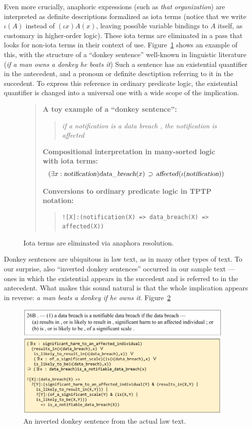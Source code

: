 \documentclass{IOS-Book-Article}
\newcommand{\eop}[1]{\mbox{\textsl{#1}}}
\newcommand{\bequ}{\begin{quote}}
\newcommand{\enqu}{\end{quote}}
\begin{document}
Even more crucially, anaphoric expressions (such as \textit{that organization}) are interpreted as definite descriptions formalized as iota terms (notice that we write $\iota(A)$ instead of $(\iota x)A(x)$, leaving possible variable bindings to $A$ itself, as customary in higher-order logic).
These iota terms are eliminated in a pass that looks for non-iota terms in their context of use.
Figure~\ref{anaphora} shows an example of this, with the structure of a ``donkey sentence'' well-known in linguistic literature (\textit{if a man owns a donkey he beats it}) \cite{geach-1962,kamp-1981}
Such a sentence has an existential quantifier in the antecedent, and a pronoun or definite desctiption referring to it in the succedent.
To express this reference in ordinary predicate logic, the existential quantifier is changed into a universal one with a wide scope of the implication.

 \begin{figure}
  \begin{framed}
  \bequ
  \textbf{A toy example of a ``donkey sentence'':}
  \bequ
 \textit{if a notification is a data breach , the notification is affected}
 \enqu

 \textbf{Compositional interpretation in many-sorted logic with iota terms:}
 \[
(\exists x : \eop{notification})\eop{data\_breach}(x) \, \supset \, \eop{affected}(\iota(\eop{notification}))
\]

 \textbf{Conversions to ordinary predicate logic in TPTP notation:}
 \bequ
\begin{verbatim}
![X]:(notification(X) => data_breach(X) => affected(X))
\end{verbatim}
 \enqu
 \enqu
   \end{framed}
 \caption{Iota terms are eliminated via anaphora resolution.
 }
\label{anaphora}
\end{figure}

Donkey sentences are ubiquitous in law text, as in many other types of text.
To our surprise, also ``inverted donkey sentences'' occurred in our sample text --- ones in which the existential appears in the succedent and is referred to in the antecedent.
What makes this sound natural is that the whole implication appears in reverse: \textit{a man beats a donkey if he owns it}.
Figure~\ref{donkey}

\begin{figure}
 \includegraphics[width=0.96\textwidth]{anaphora.png}
\caption{An inverted donkey sentence from the actual law text.}
\label{donkey}
\end{figure}
\end{document}
